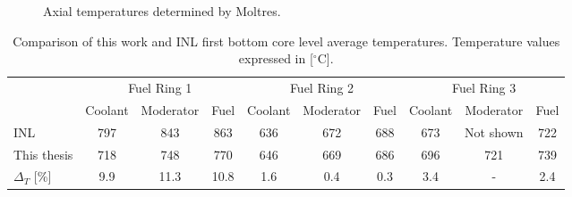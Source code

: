 \begin{figure}[htbp!]
  \centering
  \hfill
  \caption{Axial temperatures determined by Moltres.}
  \label{fig:ex2a-temps}
\end{figure}

\begin{table}[htbp!]
\centering
      \caption{Comparison of this work and INL \cite{strydom_inl_2013} first bottom core level average temperatures. Temperature values expressed in [$^{\circ}$C].}
      \label{tab:th-ex2a-results}
  \begin{tabular}{l|ccc|ccc|ccc}
    \toprule
          & \multicolumn{3}{c|}{Fuel Ring 1} & \multicolumn{3}{c|}{Fuel Ring 2} & \multicolumn{3}{c}{Fuel Ring 3} \\ %
          & Coolant & Moderator & Fuel & Coolant & Moderator & Fuel & Coolant & Moderator & Fuel \\
    \midrule
INL          & 797  & 843  & 863  & 636  & 672  & 688  & 673  & Not shown  & 722  \\
This thesis  & 718  & 748  & 770  & 646  & 669  & 686  & 696  & 721        & 739  \\
$\Delta_T$ [\%]     & 9.9  & 11.3 & 10.8 & 1.6  & 0.4  & 0.3  & 3.4  & -  & 2.4  \\
    \bottomrule
  \end{tabular}
\end{table}

